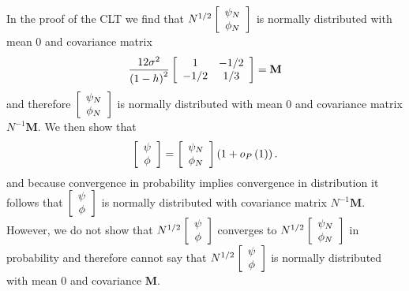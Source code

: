 \documentclass{article}
\begin{document}
In the proof of the CLT we find that
$
N^{1/2}\left[\begin{array} 
[c]{c}%
\psi_{N}\\
\phi_{N}%
\end{array}
\right]
$
is normally distributed with mean 0 and covariance matrix
\[
\frac{12\sigma^{2}}{\left(  1-h  \right)  ^{2}}\left[
\begin{array}
[c]{cc}%
1 & -1/2\\
-1/2 & 1/3
\end{array}
\right] = \mathbf{M}
\]
and therefore
$
\left[\begin{array} 
[c]{c}%
\psi_{N}\\
\phi_{N}%
\end{array}
\right]
$
is normally distributed with mean 0 and covariance matrix $N^{-1}\mathbf{M}$. We then show that
\[
\left[
\begin{array}
[c]{c}%
\psi\\
\phi
\end{array}
\right]  =\left[
\begin{array} 
[c]{c}%
\psi_{N}\\
\phi_{N}%
\end{array}
\right]  \left(  1+o_{P}\left(  1\right)  \right)  .
\]
and because convergence in probability implies convergence in distribution it follows that $\left[
\begin{array}
[c]{c}%
\psi\\
\phi
\end{array}
\right]$
is normally distributed with covariance matrix $N^{-1}\mathbf{M}$.  However, we do not show that
$N^{1/2}\left[\begin{array}
[c]{c}%
\psi\\
\phi
\end{array}
\right]$
converges to $N^{1/2}\left[
\begin{array} 
[c]{c}%
\psi_{N}\\
\phi_{N}%
\end{array}
\right]$
in probability and therefore cannot say that $N^{1/2}\left[\begin{array}
[c]{c}%
\psi\\
\phi
\end{array}
\right]$ is normally distributed with mean 0 and covariance $\mathbf{M}$.
\end{document}
